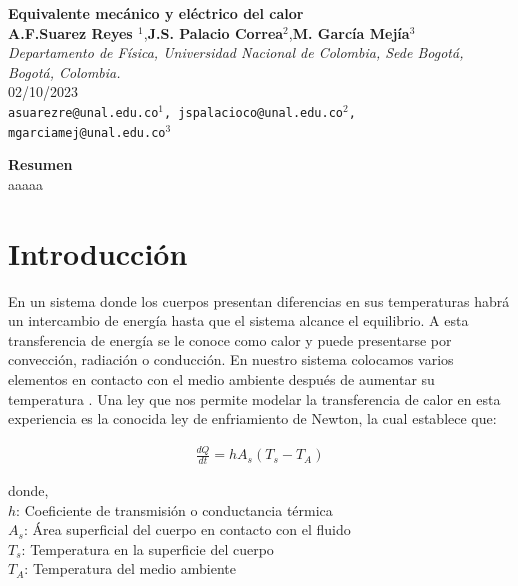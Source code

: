 \documentclass{article}
\date{}
\begin{document}
 
     \begin{center}
        {\Large \textbf{Equivalente mecánico y eléctrico del calor}}\\
        \vspace{5mm}
        {\small \textbf{A.F.Suarez Reyes $^{1}$},\textbf{J.S. Palacio Correa$^{2}$},\textbf{M. García Mejía$^{3}$} \\
        \vspace{3mm}}
        {\small \textit{Departamento de Física, Universidad Nacional de Colombia, Sede Bogotá, Bogotá, Colombia.}}\\
        \vspace{3mm}
        {\small 02/10/2023}\\
        \vspace{3mm}
        {\texttt{\textup{asuarezre@unal.edu.co$^{1}$, jspalacioco@unal.edu.co$^2$, mgarciamej@unal.edu.co$^{3}$}}} \\
    \end{center}
    
    
    \vspace{5mm}

{\large \textbf{Resumen}}\\
aaaaa


\textit{ \hspace{2mm}}


\section{Introducción}

En un sistema donde los cuerpos presentan diferencias en sus temperaturas habrá un intercambio de energía hasta que el sistema alcance el equilibrio. A esta transferencia de energía  se le conoce como calor y puede presentarse por convección, radiación o conducción. 
En nuestro sistema colocamos varios elementos en contacto con el medio ambiente después de aumentar su temperatura . Una ley que nos permite modelar la transferencia de calor en esta experiencia es la conocida ley de enfriamiento de Newton, la cual establece que: 

\begin{align}
    \frac{dQ}{dt} = hA_s(T_s-T_A) 
\end{align}

donde,  \\ 
$h$:  Coeficiente de transmisión o conductancia térmica  \\ 
$A_s$: Área superficial del cuerpo en contacto con el fluido \\ 
$T_s$: Temperatura en la superficie del cuerpo \\ 
$T_A$: Temperatura del medio ambiente
\end{document}
